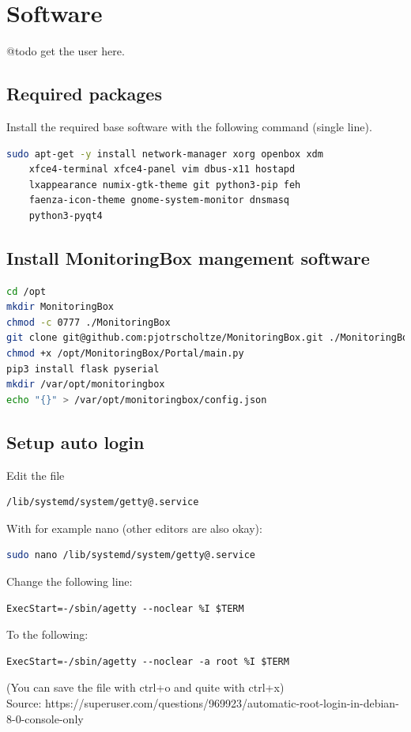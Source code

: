 \documentclass[11pt]{report}
\begin{document}
		\newpage
	\section{Software}
		@todo get the user here.
		\subsection{Required packages}
			Install the required base software with the following command (single line).
			\begin{lstlisting}[language=sh]
sudo apt-get -y install network-manager xorg openbox xdm 
	xfce4-terminal xfce4-panel vim dbus-x11 hostapd
	lxappearance numix-gtk-theme git python3-pip feh
	faenza-icon-theme gnome-system-monitor dnsmasq
	python3-pyqt4
			\end{lstlisting}
		\subsection{Install MonitoringBox mangement software}
			\begin{lstlisting}[language=sh]
cd /opt
mkdir MonitoringBox
chmod -c 0777 ./MonitoringBox
git clone git@github.com:pjotrscholtze/MonitoringBox.git ./MonitoringBox
chmod +x /opt/MonitoringBox/Portal/main.py 
pip3 install flask pyserial
mkdir /var/opt/monitoringbox
echo "{}" > /var/opt/monitoringbox/config.json

			\end{lstlisting}

		\subsection{Setup auto login}
			Edit the file
			\begin{lstlisting}[language=sh]
/lib/systemd/system/getty@.service
			\end{lstlisting}
			With for example nano (other editors are also okay):
			\begin{lstlisting}[language=sh]
sudo nano /lib/systemd/system/getty@.service
			\end{lstlisting}
			Change the following line:
			\begin{lstlisting}
ExecStart=-/sbin/agetty --noclear %I $TERM
			\end{lstlisting}
			To the following:
			\begin{lstlisting}
ExecStart=-/sbin/agetty --noclear -a root %I $TERM
			\end{lstlisting}
			(You can save the file with ctrl+o and quite with ctrl+x)\\
			Source: https://superuser.com/questions/969923/automatic-root-login-in-debian-8-0-console-only
\end{document}
